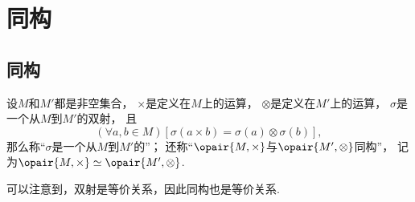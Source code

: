 \section{同构}
\subsection{同构}
\begin{definition}
设\(M\)和\(M'\)都是非空集合，
\(\times\)是定义在\(M\)上的运算，
\(\otimes\)是定义在\(M'\)上的运算，
\(\sigma\)是一个从\(M\)到\(M'\)的双射，
且\[
	(\forall a,b \in M)[\sigma(a \times b) = \sigma(a) \otimes \sigma(b)],
\]
那么称“\(\sigma\)是一个从\(M\)到\(M'\)的”；
还称“\(\opair{M,\times}\)与\(\opair{M',\otimes}\)同构”，
记为\(\opair{M,\times} \simeq \opair{M',\otimes}\).
\end{definition}

可以注意到，双射是等价关系，因此同构也是等价关系.
